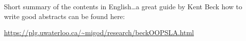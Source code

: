 
{}

\begingroup
\let\clearpage\relax
\let\cleardoublepage\relax
\let\cleardoublepage\relax

\thispagestyle{plain}
\vspace*{-2.2cm}

\begin{center}

    \vspace*{0.2cm}

    {\color{CTtitle}\spacedallcaps{\myTitle}}

    {
    \color{darkgray}
    \vspace*{0.2cm}

    \spacedlowsmallcaps{\myName}
    \vspace*{-3mm}

    \vspace*{-3mm}

    \spacedlowsmallcaps{\myTime}
    }

    \vspace*{0.3cm}
\end{center}


\noindent
Short summary of the contents in English\dots a great guide by
Kent Beck how to write good abstracts can be found here:
%
\begin{center}
    \url{https://plg.uwaterloo.ca/~migod/research/beckOOPSLA.html}
\end{center}

\vfill


\endgroup

\vfill
